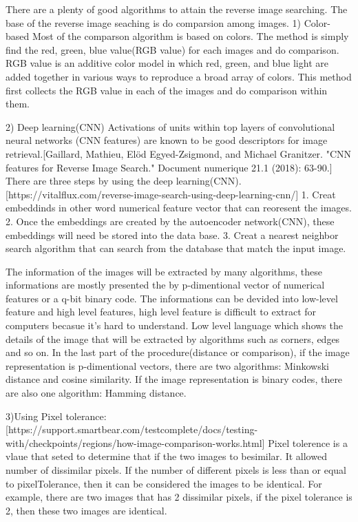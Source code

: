 There are a plenty of good algorithms to attain the reverse image searching.
The base of the reverse image seaching is do comparsion among images.
1) Color-based
Most of the comparson algorithm is based on colors.
The method is simply find the red, green, blue value(RGB value) for each images and do comparison.
RGB value is an additive color model in which red, green, and blue light are added together in various ways to reproduce a broad array of colors.
This method first collects the RGB value in each of the images and do comparison within them.

2) Deep learning(CNN)
Activations of units within top layers of convolutional neural networks (CNN features) are known to be good descriptors for image retrieval.[Gaillard, Mathieu, Elöd Egyed-Zsigmond, and Michael Granitzer. "CNN features for Reverse Image Search." Document numerique 21.1 (2018): 63-90.]
There are three steps by using the deep learning(CNN).[https://vitalflux.com/reverse-image-search-using-deep-learning-cnn/]
1. Creat embeddinds in other word numerical feature vector that can reoresent the images.
2. Once the embeddings are created by the autoencoder network(CNN), these embeddings will need be stored into the data base.
3. Creat a nearest neighbor search algorithm that can search from the database that match the input image.

The information of the images will be extracted by many algorithms, 
these informations are mostly presented the by p-dimentional vector of numerical features or a q-bit binary code.
The informations can be devided into low-level feature and high level features, 
high level feature is difficult to extract for computers becasue it's hard to understand.
Low level language which shows the details of the image that will be extracted by algorithms such as corners, edges and so on.
In the last part of the procedure(distance or comparison), if the image representation is p-dimentional vectors,
there are two algorithms: Minkowski distance and cosine similarity. If the image representation is binary codes, 
there are also one algorithm: Hamming distance.

3)Using Pixel tolerance:
[https://support.smartbear.com/testcomplete/docs/testing-with/checkpoints/regions/how-image-comparison-works.html]
Pixel tolerence is a vlaue that seted to determine that if the two images to besimilar.
It allowed number of dissimilar pixels. 
If the number of different pixels is less than or equal to pixelTolerance, 
then it can be considered the images to be identical.
For example, there are two images that has 2 dissimilar pixels,
if the pixel tolerance is 2, then these two images are identical.

